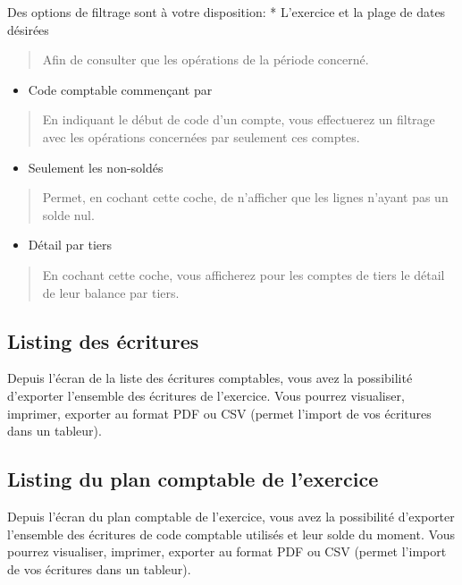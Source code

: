 \documentclass[a4paper,10pt,oneside,french]{sphinxmanual}
\begin{document}
Des options de filtrage sont à votre disposition:
* L’exercice et la plage de dates désirées
\begin{quote}

Afin de consulter que les opérations de la période concerné.
\end{quote}
\begin{itemize}
\item {} 
Code comptable commençant par

\end{itemize}
\begin{quote}

En indiquant le début de code d’un compte, vous effectuerez un filtrage avec les opérations concernées par seulement ces comptes.
\end{quote}
\begin{itemize}
\item {} 
Seulement les non-soldés

\end{itemize}
\begin{quote}

Permet, en cochant cette coche, de n’afficher que les lignes n’ayant pas un solde nul.
\end{quote}
\begin{itemize}
\item {} 
Détail par tiers

\end{itemize}
\begin{quote}

En cochant cette coche, vous afficherez pour les comptes de tiers le détail de leur balance par tiers.
\end{quote}


\subsection{Listing des écritures}
\label{\detokenize{accounting/reporting:listing-des-ecritures}}
Depuis l’écran de la liste des écritures comptables, vous avez la possibilité d’exporter l’ensemble des écritures de l’exercice.
Vous pourrez visualiser, imprimer, exporter au format PDF ou CSV (permet l’import de vos écritures dans un tableur).


\subsection{Listing du plan comptable de l’exercice}
\label{\detokenize{accounting/reporting:listing-du-plan-comptable-de-l-exercice}}
Depuis l’écran du plan comptable de l’exercice, vous avez la possibilité d’exporter l’ensemble des écritures de code comptable utilisés et leur solde du moment.
Vous pourrez visualiser, imprimer, exporter au format PDF ou CSV (permet l’import de vos écritures dans un tableur).
\end{document}
